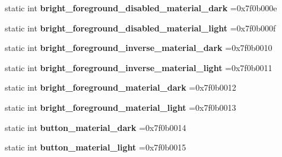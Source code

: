 \begin{DoxyCompactItemize}
static int {\bfseries bright\+\_\+foreground\+\_\+disabled\+\_\+material\+\_\+dark} =0x7f0b000e
\item 
\mbox{\label{classandroid_1_1support_1_1graphics_1_1drawable_1_1R_1_1color_ae57220258529e240af26624dc5ae6ac0}} 
static int {\bfseries bright\+\_\+foreground\+\_\+disabled\+\_\+material\+\_\+light} =0x7f0b000f
\item 
\mbox{\label{classandroid_1_1support_1_1graphics_1_1drawable_1_1R_1_1color_a57bec8448ab4d12d9e7f20317a07b00d}} 
static int {\bfseries bright\+\_\+foreground\+\_\+inverse\+\_\+material\+\_\+dark} =0x7f0b0010
\item 
\mbox{\label{classandroid_1_1support_1_1graphics_1_1drawable_1_1R_1_1color_a9063c0ea931f8a64c7873a2e89ae5722}} 
static int {\bfseries bright\+\_\+foreground\+\_\+inverse\+\_\+material\+\_\+light} =0x7f0b0011
\item 
\mbox{\label{classandroid_1_1support_1_1graphics_1_1drawable_1_1R_1_1color_a525f2b900643ae26b8528be28b1aaa87}} 
static int {\bfseries bright\+\_\+foreground\+\_\+material\+\_\+dark} =0x7f0b0012
\item 
\mbox{\label{classandroid_1_1support_1_1graphics_1_1drawable_1_1R_1_1color_a2e578ec65d8760ea2bcdada3fa5d998f}} 
static int {\bfseries bright\+\_\+foreground\+\_\+material\+\_\+light} =0x7f0b0013
\item 
\mbox{\label{classandroid_1_1support_1_1graphics_1_1drawable_1_1R_1_1color_af0f971eb00c36a45cc2376dd32262ecc}} 
static int {\bfseries button\+\_\+material\+\_\+dark} =0x7f0b0014
\item 
\mbox{\label{classandroid_1_1support_1_1graphics_1_1drawable_1_1R_1_1color_a74a580a2e0405a4a2d7bb96709b23237}} 
static int {\bfseries button\+\_\+material\+\_\+light} =0x7f0b0015
\item 

\end{DoxyCompactItemize}
